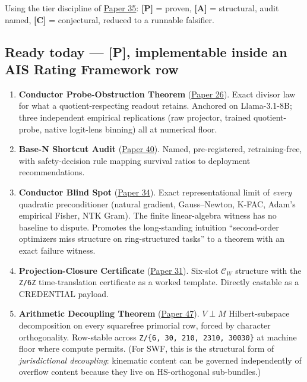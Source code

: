 \documentclass[
  letterpaper,
  11pt]{article}
\providecommand{\tightlist}{%
  \setlength{\itemsep}{0pt}\setlength{\parskip}{0pt}}
\theoremstyle{plain}
\theoremstyle{definition}
\theoremstyle{remark}
\begin{document}
Using the tier discipline of \href{C:/Projects/simplicial/35_grounded_paranoid_delusional_methodology.md}{Paper 35}: \textbf{{[}P{]}} = proven, \textbf{{[}A{]}} = structural, audit named, \textbf{{[}C{]}} = conjectural, reduced to a runnable falsifier.

\subsection{Ready today --- {[}P{]}, implementable inside an AIS Rating Framework row}\label{ready-today-p-implementable-inside-an-ais-rating-framework-row}

\begin{enumerate}
\def\labelenumi{\arabic{enumi}.}
\tightlist
\item
  \textbf{Conductor Probe-Obstruction Theorem} (\href{C:/Projects/simplicial/26.conductor_probe_obstruction_theorem.md}{Paper 26}). Exact divisor law for what a quotient-respecting readout retains. Anchored on Llama-3.1-8B; three independent empirical replications (raw projector, trained quotient-probe, native logit-lens binning) all at numerical floor.
\item
  \textbf{Base-N Shortcut Audit} (\href{C:/Projects/simplicial/40_base_n_shortcut_audit_as_a_safety_primitive.md}{Paper 40}). Named, pre-registered, retraining-free, with safety-decision rule mapping survival ratios to deployment recommendations.
\item
  \textbf{Conductor Blind Spot} (\href{C:/Projects/simplicial/34_the_conductor_blind_spot.md}{Paper 34}). Exact representational limit of \emph{every} quadratic preconditioner (natural gradient, Gauss--Newton, K-FAC, Adam's empirical Fisher, NTK Gram). The finite linear-algebra witness has no baseline to dispute. Promotes the long-standing intuition ``second-order optimizers miss structure on ring-structured tasks'' to a theorem with an exact failure witness.
\item
  \textbf{Projection-Closure Certificate} (\href{C:/Projects/simplicial/31.projection_closure_theory.md}{Paper 31}). Six-slot \(\mathcal{C}_W\) structure with the \texttt{Z/6Z} time-translation certificate as a worked template. Directly castable as a CREDENTIAL payload.
\item
  \textbf{Arithmetic Decoupling Theorem} (\href{C:/Projects/simplicial/47_arithmetic_decoupling_theorem.md}{Paper 47}). \(V \perp M\) Hilbert-subspace decomposition on every squarefree primorial row, forced by character orthogonality. Row-stable across \texttt{Z/\{6,\ 30,\ 210,\ 2310,\ 30030\}} at machine floor where compute permits. (For SWF, this is the structural form of \emph{jurisdictional decoupling}: kinematic content can be governed independently of overflow content because they live on HS-orthogonal sub-bundles.)
\end{enumerate}
\end{document}
